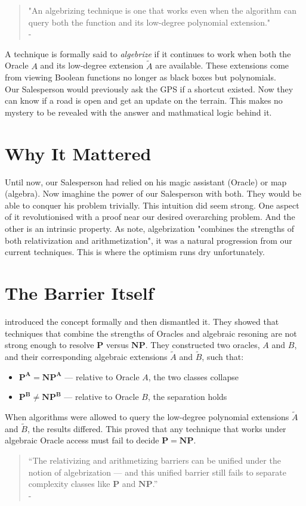 \documentclass[12pt]{report}
\begin{document}
\begin{quote}
    "An algebrizing technique is one that works even when the algorithm can query both the function and its low-degree polynomial extension."\\
    - \cite{arora2008algebrization}
\end{quote}
A technique is formally said to \textit{algebrize} if it continues to work when both the Oracle $A$ and its low-degree extension $\tilde{A}$ are available.
These extensions come from viewing Boolean functions no longer as black boxes but polynomials.\\ 
Our Salesperson would previously ask the GPS if a shortcut existed.
Now they can know if a road is open and get an update on the terrain.
This makes no mystery to be revealed with the answer and mathmatical logic behind it.

\section{Why It Mattered}
Until now, our Salesperson had relied on his magic assistant (Oracle) or map (algebra).
Now imaghine the power of our Salesperson with both.
They would be able to conquer his problem trivially.
This intuition did seem strong.
One aspect of it revolutionised with a proof near our desired overarching problem.
And the other is an intrinsic property.
As \cite{arora2009} note, algebrization "combines the strengths of both relativization and arithmetization", it was a natural progression from our current techniques.
This is where the optimism runs dry unfortunately.

\section{The Barrier Itself}
\cite{arora2008algebration} introduced the concept formally and then dismantled it.
They showed that techniques that combine the strengths of Oracles and algebraic resoning are not strong enough to resolve $\mathbf{P}$ versus $\mathbf{NP}$.  
They constructed two oracles, $A$ and $B$, and their corresponding algebraic extensions $\tilde{A}$ and $\tilde{B}$, such that:
\begin{itemize}
    \item $\mathbf{P^A = NP^A}$ --- relative to Oracle $A$, the two classes collapse
    \item $\mathbf{P^B \ne NP^B}$ --- relative to Oracle $B$, the separation holds
\end{itemize}
When algorithms were allowed to query the low-degree polynomial extensions $\tilde{A}$ and $\tilde{B}$, the results differed.
This proved that any technique that works under algebraic Oracle access must fail to decide $\mathbf{P = NP}$.
\begin{quote}
    “The relativizing and arithmetizing barriers can be unified under the notion of algebrization --- and this unified barrier still fails to separate complexity classes like $\mathbf{P}$ and $\mathbf{NP}$.”\\
    - \cite{arora2008algebrization}
\end{quote}
\end{document}
